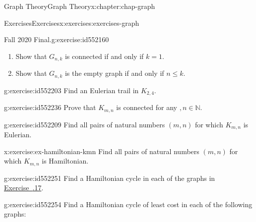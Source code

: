 \documentclass[oneside,10pt,]{book}
\newcommand{\xreffont}{\relax}
\numberwithin{equation}{section}
\begin{document}
\begin{chapterptx}{Graph Theory}{}{Graph Theory}{}{}{x:chapter:chap-graph}
\begin{exercises-section}{Exercises}{}{Exercises}{}{}{x:exercises:exercises-graph}
\begin{divisionexercise}{28}{Fall 2020 Final.}{}{g:exercise:id552160}
\begin{enumerate}[label=(\alph*)]
\item{}Show that \(G_{n,k}\) is connected if and only if \(k = 1\).%
\item{}Show that \(G_{n,k}\) is the empty graph if and only if \(n \leq k\).%
\end{enumerate}
%
\end{divisionexercise}%
\begin{divisionexercise}{29}{}{}{g:exercise:id552203}%
Find an Eulerian trail in \(K_{2,4}\).%
\end{divisionexercise}%
\begin{divisionexercise}{30}{}{}{g:exercise:id552236}%
Prove that \(K_{m,n}\) is connected for any \(,n \in \mathbb{N}\).%
\end{divisionexercise}%
\begin{divisionexercise}{31}{}{}{g:exercise:id552209}%
Find all pairs of natural numbers \((m,n)\) for which \(K_{m,n}\) is Eulerian.%
\end{divisionexercise}%
\begin{divisionexercise}{32}{}{}{x:exercise:ex-hamiltonian-kmn}%
Find all pairs of natural numbers \((m,n)\) for which \(K_{m,n}\) is Hamiltonian.%
\end{divisionexercise}%
\begin{divisionexercise}{33}{}{}{g:exercise:id552251}%
Find a Hamiltonian cycle in each of the graphs in \hyperlink{x:exercise:ex-any-isomorphic}{Exercise~{\xreffont 5.8.17}}.%
\end{divisionexercise}%
\begin{divisionexercise}{34}{}{}{g:exercise:id552254}%
Find a Hamiltonian cycle of least cost in each of the following graphs:%
\begin{sidebyside}{2}{0.2}{0.2}{0.1}%
\begin{sbspanel}{0.22}%
\end{sbspanel}
\end{sidebyside}
\end{divisionexercise}
\end{exercises-section}
\end{chapterptx}
\end{document}
